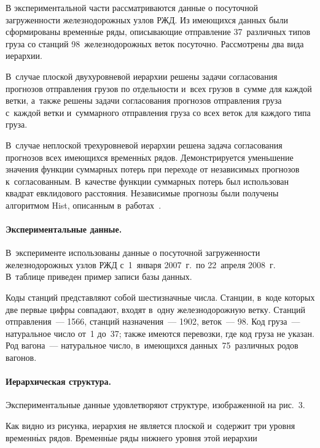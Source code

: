 \begin{multicols}{2}
В экспериментальной части рассматриваются данные о посуточной
загруженности железнодорожных узлов РЖД. Из имеющихся данных были
сформированы временн$\acute{\mbox{ы}}$е ряды, описывающие отправление 37~различных
типов груза со станций 98~железнодорожных веток посуточно.
Рассмотрены два вида иерархии.

В~случае плоской двухуровневой
иерархии решены задачи согласования прогнозов отправления грузов
по отдельности и~всех грузов в~сумме для каждой ветки, а~так\-же
решены задачи согласования прогнозов отправления груза с~каждой
ветки и~суммарного отправления груза со всех веток для каждого
типа груза.

В~случае неплоской трехуровневой иерархии решена
задача согласования прогнозов всех име\-ющих\-ся временн$\acute{\mbox{ы}}$х рядов.
Демонстрируется уменьшение значения функции суммарных потерь при
переходе от независимых прогнозов к~согласованным. В~качестве
функции суммарных потерь был использован квад\-рат евклидового
расстояния. Независимые прогнозы были получены алгоритмом Hist,
описанным в~работах~\cite{stenina2014reconciliation, medvednikova2012nonparametric}.

\vspace*{-5pt}

\paragraph*{Экспериментальные данные.} В~эксперименте использованы данные о посуточной загруженности
железнодорожных узлов РЖД с~1~января 2007~г.\ по 22~апреля 2008~г. В~таблице
приведен пример записи базы данных.


Коды станций представляют собой шестизначные числа. Станции, в~коде которых две первые цифры совпадают, входят в~одну
железнодорожную ветку. Станций отправления~--- 1566, станций
назначения~--- 1902, веток~--- 98. Код груза~--- натуральное число от~1 до~37; также имеются перевозки, где код груза не указан. Род
вагона~--- натуральное число, в~имеющихся данных~75~различных
родов вагонов.

\vspace*{-5pt}

\paragraph*{Иерархическая структура.}
Экспериментальные данные удовлетворяют структуре, изображенной на
рис.~3.

Как видно из рисунка, иерархия не
является плоской и~содержит три уровня временн$\acute{\mbox{ы}}$х рядов.
Временн$\acute{\mbox{ы}}$е
ряды нижнего уровня этой иерархии\linebreak\vspace*{-12pt}



\end{multicols}
